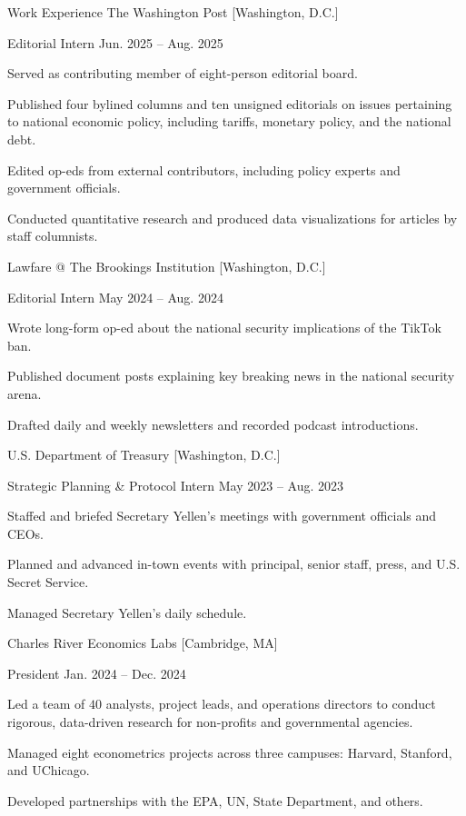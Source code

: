 \documentclass[11pt,a4paper]{article}
\begin{document}
\SectionHeader
    {Work Experience}
\Entry
    {The Washington Post}
    [Washington, D.C.]
    {
        \Position
            {Editorial Intern}
            {Jun. 2025 -- Aug. 2025}
            {
                \item Served as contributing member of eight-person editorial board.
                \item Published four bylined columns and ten unsigned editorials on issues pertaining to national economic policy, including tariffs, monetary policy, and the national debt.
                \item Edited op-eds from external contributors, including policy experts and government officials.
                \item Conducted quantitative research and produced data visualizations for articles by staff columnists.
            }
    }
\Entry
    {Lawfare @ The Brookings Institution}
    [Washington, D.C.]
    {
        \Position
            {Editorial Intern}
            {May 2024 -- Aug. 2024}
            {
                \item Wrote long-form op-ed about the national security implications of the TikTok ban.
                \item Published document posts explaining key breaking news in the national security arena.
                \item Drafted daily and weekly newsletters and recorded podcast introductions.
            }
    }
\Entry
    {U.S. Department of Treasury}
    [Washington, D.C.]
    {
        \Position
            {Strategic Planning \& Protocol Intern}
            {May 2023 -- Aug. 2023}
            {
                \item Staffed and briefed Secretary Yellen's meetings with government officials and CEOs.
                \item Planned and advanced in-town events with principal, senior staff, press, and U.S. Secret Service.
                \item Managed Secretary Yellen's daily schedule.
            }
    }
\Entry
    {Charles River Economics Labs}
    [Cambridge, MA]
    {
        \Position
            {President}
            {Jan. 2024 -- Dec. 2024}
            {
                \item Led a team of $40$ analysts, project leads, and operations directors to conduct rigorous, data-driven research for non-profits and governmental agencies.
                \item Managed eight econometrics projects across three campuses: Harvard, Stanford, and UChicago.
                \item Developed partnerships with the EPA, UN, State Department, and others.
            }
    }
\end{document}
